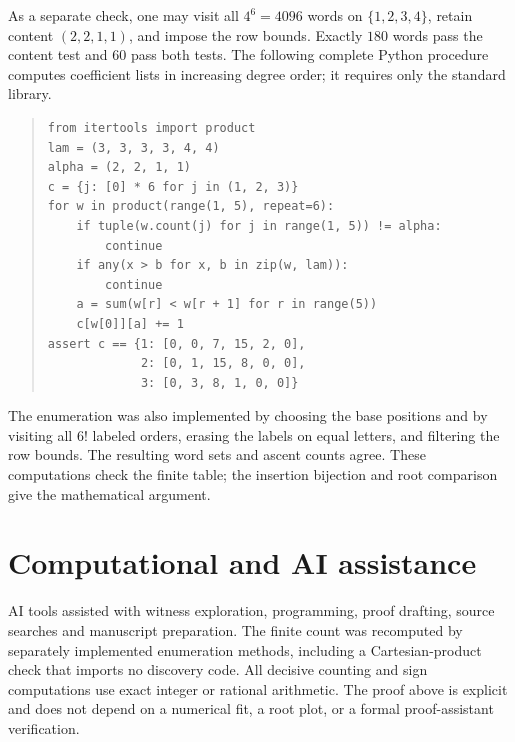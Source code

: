 \documentclass[11pt]{article}
\begin{document}
As a separate check, one may visit all $4^6=4096$ words on
$\{1,2,3,4\}$, retain content $(2,2,1,1)$, and impose the row bounds.
Exactly $180$ words pass the content test and $60$ pass both tests.
The following complete Python procedure computes coefficient lists in
increasing degree order; it requires only the standard library.
\begin{quote}\small
\begin{verbatim}
from itertools import product
lam = (3, 3, 3, 3, 4, 4)
alpha = (2, 2, 1, 1)
c = {j: [0] * 6 for j in (1, 2, 3)}
for w in product(range(1, 5), repeat=6):
    if tuple(w.count(j) for j in range(1, 5)) != alpha:
        continue
    if any(x > b for x, b in zip(w, lam)):
        continue
    a = sum(w[r] < w[r + 1] for r in range(5))
    c[w[0]][a] += 1
assert c == {1: [0, 0, 7, 15, 2, 0],
             2: [0, 1, 15, 8, 0, 0],
             3: [0, 3, 8, 1, 0, 0]}
\end{verbatim}
\end{quote}
The enumeration was also implemented by choosing the base positions
and by visiting all $6!$ labeled orders, erasing the labels on equal
letters, and filtering the row bounds. The resulting word sets and ascent
counts agree. These computations check the finite table; the insertion
bijection and root comparison give the mathematical argument.

\section*{Computational and AI assistance}
AI tools assisted with witness exploration, programming, proof drafting,
source searches and manuscript preparation. The finite count was
recomputed by separately implemented enumeration methods, including a
Cartesian-product check that imports no discovery code. All decisive
counting and sign computations use exact integer or rational arithmetic.
The proof above is explicit and does not depend on a numerical fit,
a root plot, or a formal proof-assistant verification.


\raggedright

\end{document}
